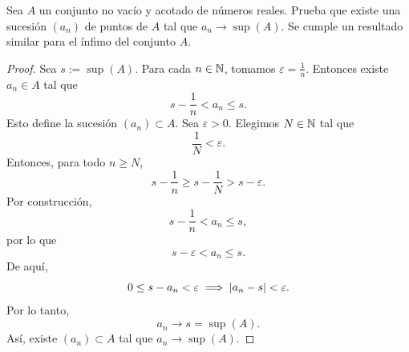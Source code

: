 \documentclass[12pt,a4paper]{article}
\begin{document}
    \begin{mdframed}[style=mdbluebox,frametitle={Ejercicio 8}]
        Sea $A$ un conjunto no vacío y acotado de números reales. Prueba que existe una sucesión $(a_{n})$ de puntos
        de $A$ tal que $a_{n}\to\sup(A)$. Se cumple un resultado similar para el ínfimo del conjunto $A$.
    \end{mdframed}

    \begin{proof}
        Sea $s:=\sup(A)$. Para cada $n\in\mathbb{N}$, tomamos $\varepsilon=\frac{1}{n}$. Entonces existe $a_{n}\in A$ tal que
        \begin{equation*}
            s-\frac{1}{n}\lt a_{n}\leq s.
        \end{equation*}
        Esto define la sucesión $(a_{n})\subset A$. Sea $\varepsilon\gt0$. Elegimos $N\in\mathbb{N}$ tal que
        \begin{equation*}
            \frac{1}{N}\lt\varepsilon.
        \end{equation*}
        Entonces, para todo $n\geq N$,
        \begin{equation*}
            s-\frac{1}{n}\geq s-\frac{1}{N}\gt s-\varepsilon.
        \end{equation*}
        Por construcción,
        \begin{equation*}
            s-\frac{1}{n}\lt a_{n}\leq s,
        \end{equation*}
        por lo que
        \begin{equation*}
            s-\varepsilon\lt a_{n}\leq s.
        \end{equation*}
        De aquí,
        \begin{equation*}
            0\leq s-a_{n}<\varepsilon\implies\abs{a_{n}-s}<\varepsilon.
        \end{equation*}
        Por lo tanto,
        \begin{equation*}
            a_{n}\to s=\sup(A).
        \end{equation*}
        Así, existe $(a_{n})\subset A$ tal que $a_{n}\to\sup(A)$.
    \end{proof}
\end{document}

